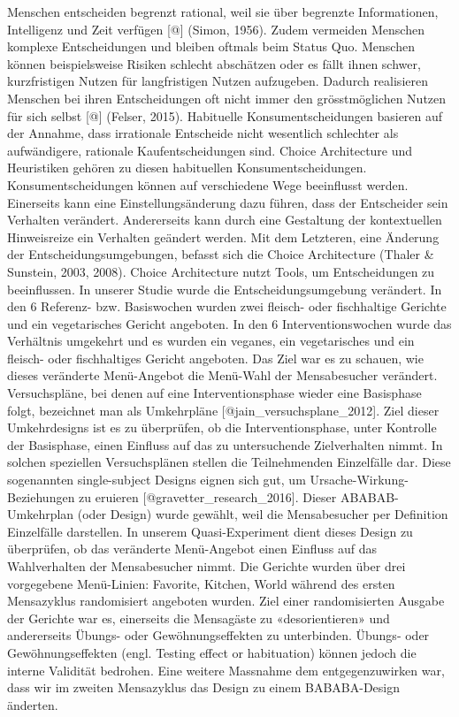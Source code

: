 \documentclass[12pt,ngerman,]{article}
\begin{document}
Menschen entscheiden begrenzt rational, weil sie über begrenzte
Informationen, Intelligenz und Zeit verfügen {[}@{]} (Simon, 1956).
Zudem vermeiden Menschen komplexe Entscheidungen und bleiben oftmals
beim Status Quo. Menschen können beispielsweise Risiken schlecht
abschätzen oder es fällt ihnen schwer, kurzfristigen Nutzen für
langfristigen Nutzen aufzugeben. Dadurch realisieren Menschen bei ihren
Entscheidungen oft nicht immer den grösstmöglichen Nutzen für sich
selbst {[}@{]} (Felser, 2015). Habituelle Konsumentscheidungen basieren
auf der Annahme, dass irrationale Entscheide nicht wesentlich schlechter
als aufwändigere, rationale Kaufentscheidungen sind. Choice Architecture
und Heuristiken gehören zu diesen habituellen Konsumentscheidungen.
Konsumentscheidungen können auf verschiedene Wege beeinflusst werden.
Einerseits kann eine Einstellungsänderung dazu führen, dass der
Entscheider sein Verhalten verändert. Andererseits kann durch eine
Gestaltung der kontextuellen Hinweisreize ein Verhalten geändert werden.
Mit dem Letzteren, eine Änderung der Entscheidungsumgebungen, befasst
sich die Choice Architecture (Thaler \& Sunstein, 2003, 2008). Choice
Architecture nutzt Tools, um Entscheidungen zu beeinflussen. In unserer
Studie wurde die Entscheidungsumgebung verändert. In den 6 Referenz-
bzw. Basiswochen wurden zwei fleisch- oder fischhaltige Gerichte und ein
vegetarisches Gericht angeboten. In den 6 Interventionswochen wurde das
Verhältnis umgekehrt und es wurden ein veganes, ein vegetarisches und
ein fleisch- oder fischhaltiges Gericht angeboten. Das Ziel war es zu
schauen, wie dieses veränderte Menü-Angebot die Menü-Wahl der
Mensabesucher verändert. Versuchspläne, bei denen auf eine
Interventionsphase wieder eine Basisphase folgt, bezeichnet man als
Umkehrpläne {[}@jain\_versuchsplane\_2012{]}. Ziel dieser Umkehrdesigns
ist es zu überprüfen, ob die Interventionsphase, unter Kontrolle der
Basisphase, einen Einfluss auf das zu untersuchende Zielverhalten nimmt.
In solchen speziellen Versuchsplänen stellen die Teilnehmenden
Einzelfälle dar. Diese sogenannten single-subject Designs eignen sich
gut, um Ursache-Wirkung-Beziehungen zu eruieren
{[}@gravetter\_research\_2016{]}. Dieser ABABAB-Umkehrplan (oder Design)
wurde gewählt, weil die Mensabesucher per Definition Einzelfälle
darstellen. In unserem Quasi-Experiment dient dieses Design zu
überprüfen, ob das veränderte Menü-Angebot einen Einfluss auf das
Wahlverhalten der Mensabesucher nimmt. Die Gerichte wurden über drei
vorgegebene Menü-Linien: Favorite, Kitchen, World während des ersten
Mensazyklus randomisiert angeboten wurden. Ziel einer randomisierten
Ausgabe der Gerichte war es, einerseits die Mensagäste zu
«desorientieren» und andererseits Übungs- oder Gewöhnungseffekten zu
unterbinden. Übungs- oder Gewöhnungseffekten (engl. Testing effect or
habituation) können jedoch die interne Validität bedrohen. Eine weitere
Massnahme dem entgegenzuwirken war, dass wir im zweiten Mensazyklus das
Design zu einem BABABA-Design änderten.
\end{document}

